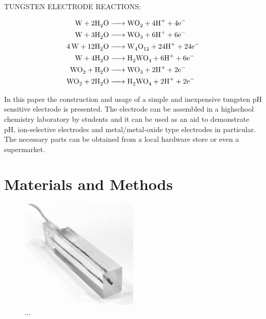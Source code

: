\documentclass[manuscript=article, journal=jceda8]{achemso}
\begin{document}
TUNGSTEN ELECTRODE REACTIONS:




\begin{align}
\ce {W + 2 H2O &-> WO2 + 4 H^+ + 4 e^-}\\
\ce {W + 3 H2O &-> WO3 + 6 H^+ + 6 e^-}\\
\ce {4W + 12 H2O &-> W4O12 + 24 H^+ + 24 e^-}\\
\ce {W + 4 H2O &-> H2WO4 + 6 H^+ + 6 e^-}\\
\ce {WO2 + H2O &-> WO3 + 2 H^+ + 2 e^-}\\
\ce {WO2 + 2 H2O &-> H2WO4 + 2 H^+ + 2 e^-}
\end{align}

In this paper the construction and usage of a simple and inexpensive tungsten pH sensitive electrode is presented. The electrode can be assembled in a highschool chemistry laboratory by students and it can be used as an aid to demonstrate pH, ion-selective electrodes and metal/metal-oxide type electrodes in particular. The necessary parts can be obtained from a local hardware store or even a supermarket.


\section{Materials and Methods}


\begin{figure}[!h]
\centering
\includegraphics[width=0.5\textwidth]{img/plexi.jpg}
\caption{...}
\label{fig:plexi}
\end{figure}
\end{document}
